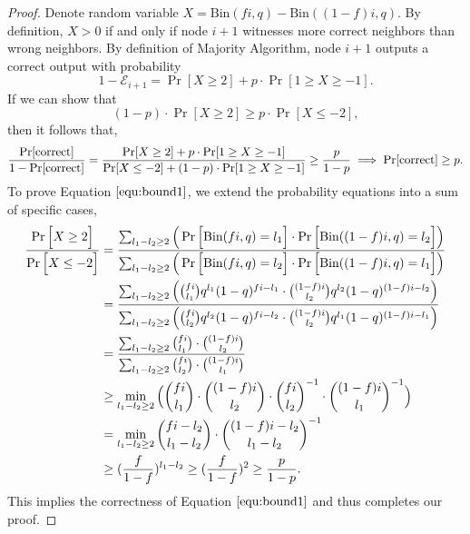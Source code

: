 \documentclass[a4paper,UKenglish]{lipics}
\theoremstyle{definition}
\begin{document}
\begin{proof}
Denote random variable $X = \text{Bin}(fi, q) - \text{Bin}((1-f)i, q)$. 
By definition, $X>0$ if and only if node $i+1$ witnesses more correct neighbors than wrong neighbors.
By definition of Majority Algorithm, node $i+1$ outputs a correct output with probability
\begin{equation*}
	1 - \mathcal{E}_{i+1}
=
	\Pr[ X \ge 2]
	+
	p\cdot \Pr[ 1 \ge X \ge -1].
\end{equation*}
If we can show that 
\begin{equation}
\label{equ:bound1}
	(1-p)\cdot\Pr[ X \ge 2 ] 
	\ge 
	p\cdot\Pr[ X \le -2 ],
\end{equation} 
then it follows that,
\begin{align*}
	{\Pr[\text{correct}]\over 1 - \Pr[\text{correct}]} 
=
	{\Pr[ X \ge 2]+ p\cdot \Pr[ 1 \ge X \ge -1] \over \Pr[ X \le -2]+ (1-p)\cdot \Pr[ 1 \ge X \ge -1]} 
\ge
	{p\over 1-p}
\implies
	\Pr[\text{correct}]
\ge
	p.
\end{align*}
To prove Equation $\eqref{equ:bound1}$, we extend the probability equations into a sum of specific cases,
\begin{align*}
	{\Pr \Big[ X \ge 2 \Big] \over \Pr\Big[ X \le -2 \Big]}
& =
	{\sum_{l_1 - l_2 \ge 2} \Big( \Pr\Big[ \text{Bin}(fi, q) = l_1 \Big]\cdot \Pr\Big[ \text{Bin}((1-f)i, q) = l_2 \Big] \Big)
	\over
	\sum_{l_1 - l_2 \ge 2} \Big( \Pr\Big[ \text{Bin}(fi, q) = l_2 \Big]\cdot \Pr\Big[ \text{Bin}((1-f)i, q) = l_1 \Big] \Big) }
\\
& =
	{\sum_{l_1 - l_2 \ge 2} \Big( {fi\choose l_1} q^{l_1}(1-q)^{fi - l_1}\cdot {(1-f)i\choose l_2} q^{l_2}(1-q)^{(1-f)i - l_2} \Big)
	\over
	\sum_{l_1 - l_2 \ge 2} \Big( {fi\choose l_2} q^{l_2}(1-q)^{fi - l_2}\cdot {(1-f)i\choose l_2} q^{l_1}(1-q)^{(1-f)i - l_1} \Big) }
\\
& =
	{\sum_{l_1 - l_2 \ge 2} {fi\choose l_1} \cdot {(1-f)i\choose l_2} 
	\over
	\sum_{l_1 - l_2 \ge 2} {fi\choose l_2} \cdot {(1-f)i\choose l_1}  }
\\
& \ge
	\min_{l_1 - l_2\ge 2} \Big( {fi\choose l_1} \cdot {(1-f)i\choose l_2}\cdot {fi\choose l_2}^{-1} \cdot {(1-f)i\choose l_1}^{-1} \Big)
\\
& =
	\min_{l_1 - l_2\ge 2} {fi - l_2 \choose l_1 - l_2} \cdot {(1-f)i - l_2 \choose l_1 - l_2}^{-1} \\
& \ge
	({f\over 1-f})^{l_1 - l_2}
	\ge
	({f\over 1-f})^2
	\ge {p\over 1-p}.
\end{align*}
This implies the correctness of Equation $\ref{equ:bound1}$ and thus completes our proof.
\end{proof}
\end{document}

